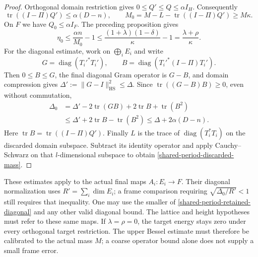 \begin{proof}
Orthogonal domain restriction gives \(0\le Q'\le Q\le\alpha I_H\).
Consequently
\[
 \operatorname{tr}((I-\Pi)Q')\le\alpha(D-n),\qquad
 M_0=M-L-\operatorname{tr}((I-\Pi)Q')\ge M\kappa.
\]
On \(F\) we have \(Q_0\le\alpha I_F\). The preceding proposition gives
\[
 \eta_0\le\frac{\alpha n}{M_0}-1
 \le\frac{(1+\lambda)(1-\delta)}{\kappa}-1
 =\frac{\lambda+\rho}{\kappa}.
\]
For the diagonal estimate, work on \(\bigoplus_iE_i\) and write
\[
 G=\operatorname{diag}(T_i'^*T_i'),\qquad
 B=\operatorname{diag}(T_i'^*(I-\Pi)T_i').
\]
Then \(0\le B\le G\), the final diagonal Gram operator is \(G-B\),
and domain compression gives
\(\Delta':=\|G-I\|_{\mathrm{HS}}^2\le\Delta\).
Since \(\operatorname{tr}((G-B)B)\ge0\), even without commutation,
\[
 \begin{split}
 \Delta_0
 &=\Delta'-2\operatorname{tr}(GB)+2\operatorname{tr}B+
                          \operatorname{tr}(B^2)\\
 &\le\Delta'+2\operatorname{tr}B-\operatorname{tr}(B^2)
 \le\Delta+2\alpha(D-n).
 \end{split}
\]
Here \(\operatorname{tr}B=\operatorname{tr}((I-\Pi)Q')\).
Finally \(L\) is the trace of
\(\operatorname{diag}(T_i^*T_i)\) on the discarded domain subspace.
Subtract its identity operator and apply Cauchy--Schwarz on that
\(l\)-dimensional subspace to obtain
\eqref{shared-period-discarded-mass}.
\end{proof}

These estimates apply to the actual final maps \(A_i:E_i\to F\).
Their diagonal normalization uses
\(R'=\sum_i\dim E_i\); a frame comparison requiring
\(\sqrt{\Delta_0/R'}<1\) still requires that inequality.
One may use the smaller of \eqref{shared-period-retained-diagonal}
and any other valid diagonal bound. The lattice and height hypotheses
must refer to these same maps.
If \(\lambda=\rho=0\), the target energy stays zero under every
orthogonal target restriction. The upper Bessel estimate must therefore
be calibrated to the actual mass \(M\); a coarse operator bound alone
does not supply a small frame error.

